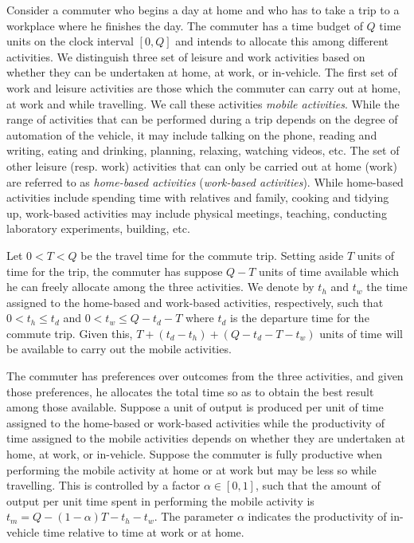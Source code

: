 \documentclass[12pt,a4paper,british]{article}
\begin{document}
Consider a commuter who begins a day at home and who has to take a trip to a workplace where he finishes the day. The commuter has a time budget of $Q$ time units on the clock interval $[0, Q]$ and intends to allocate this among different activities. We distinguish three set of leisure and work activities based on whether they can be undertaken at home, at work, or in-vehicle. The first set of work and leisure activities are those which the commuter can carry out at home, at work and while travelling. We call these activities \textit{mobile activities}. While the range of activities that can be performed during a trip depends on the degree of automation of the vehicle, it may include talking on the phone, reading and writing, eating and drinking, planning, relaxing, watching videos, etc. The set of other leisure (resp. work) activities that can only be carried out at home (work) are referred to as \emph{home-based activities} (\emph{work-based activities}). While home-based activities include spending time with relatives and family, cooking and tidying up, work-based activities may include physical meetings, teaching, conducting laboratory experiments, building, etc.


Let $0<T<Q$ be the travel time for the commute trip. Setting aside $T$ units of time for the trip, the commuter has suppose $Q-T$ units of time available which he can freely allocate among the three activities. We denote by $t_{h}$ and $t_{w}$ the time assigned to the home-based and work-based activities, respectively, such that $0<t_{h}\leq t_{d}$ and $0<t_{w}\leq Q-t_{d}-T$ where $t_d$ is the departure time for the commute trip. Given this,  $T+\left(t_{d}-t_{h}\right)+\left(Q-t_{d}-T-t_{w}\right)$ units of time will be available to carry out the mobile activities.


The commuter has preferences over outcomes from the three activities, and given those preferences, he allocates the total time so as to obtain the best result among those available. Suppose a unit of output is produced per unit of time assigned to the home-based or work-based activities while the productivity of time assigned to the mobile activities depends on whether they are undertaken at home, at work, or in-vehicle. Suppose the commuter is fully productive when performing the mobile activity at home or at work but may be less so while travelling. This is controlled by a factor $\alpha \in \left[0, 1\right]$, such that the amount of output per unit time spent in performing the mobile activity is $t_{m} = Q - \left( 1 - \alpha \right) T - t_{h} - t_{w}$. The parameter $\alpha$ indicates the productivity of in-vehicle time relative to time at work or at home.
\end{document}
